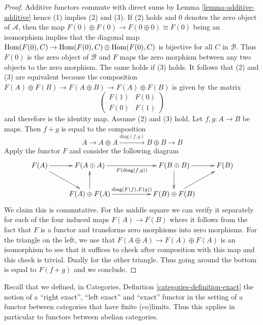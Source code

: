 \begin{proof}
Additive functors commute with direct sums by
Lemma \ref{lemma-additive-additive} hence (1)
implies (2) and (3). If (2) holds and $0$ denotes the
zero object of $\mathcal{A}$, then the map
$F(0) \oplus F(0) \to F(0 \oplus 0) \cong F(0)$
being an isomorphism implies that the diagonal map
$\mathop{\mathrm{Hom}}\nolimits(F(0), C) \to \mathop{\mathrm{Hom}}\nolimits(F(0), C) \oplus \mathop{\mathrm{Hom}}\nolimits(F(0), C)$
is bijective for all $C$ in $\mathcal{B}$. Thus $F(0)$
is the zero object of $\mathcal{B}$ and $F$ maps the
zero morphism between any two objects to the zero morphism.
The same holds if (3) holds. It follows that (2) and (3)
are equivalent because the composition
$F(A) \oplus F(B) \to F(A \oplus B) \to F(A) \oplus F(B)$
is given by the matrix
$$
\left(
\begin{matrix}
F(1) & F(0) \\
F(0) & F(1)
\end{matrix}
\right)
$$
and therefore is the identity map. Assume (2) and (3) hold.
Let $f, g : A \to B$ be maps. Then $f + g$ is equal to
the composition
$$
A \to A \oplus A \xrightarrow{\text{diag}(f, g)} B \oplus B \to B
$$
Apply the functor $F$ and consider the following diagram
$$
\xymatrix{
F(A) \ar[r] \ar[rd] &
F(A \oplus A) \ar[rr]_{F(\text{diag}(f, g))} & &
F(B \oplus B) \ar[r] \ar[d] &
F(B) \\
&
F(A) \oplus F(A) \ar[u] \ar[rr]^{\text{diag}(F(f), F(g))} & &
F(B) \oplus F(B) \ar[ru]
}
$$
We claim this is commutative. For the middle square we can verify it
separately for each of the four induced maps $F(A) \to F(B)$
where it follows from the fact that $F$ is a functor and
transforms zero morphisms into zero morphisms.
For the triangle on the left, we use that
$F(A \oplus A) \to F(A) \oplus F(A)$ is an isomorphism
to see that it suffices to check after composition with
this map and this check is trivial. Dually for the other triangle.
Thus going around the bottom is equal to $F(f + g)$ and we conclude.
\end{proof}

\noindent
Recall that we defined, in
Categories, Definition \ref{categories-definition-exact}
the notion of a ``right exact'', ``left exact'' and
``exact'' functor in the setting of a functor between
categories that have finite (co)limits. Thus this
applies in particular to functors between abelian
categories.

